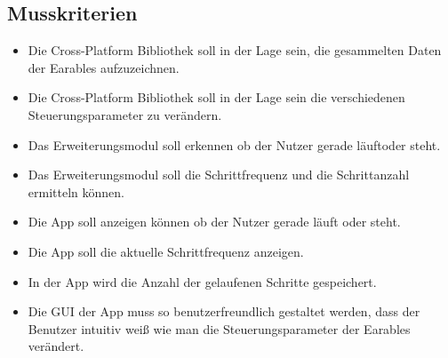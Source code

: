 \documentclass[a4paper,12pt]{article}
\begin{document}
\subsection{Musskriterien}

  \begin{itemize}
    \item Die \Gls{Cross-Platform Bibliothek} soll in der Lage sein, die gesammelten Daten der \Gls{Earables} aufzuzeichnen.
    \item Die \Gls{Cross-Platform Bibliothek} soll in der Lage sein die verschiedenen \Gls{Steuerungsparameter} zu verändern.
    \item Das Erweiterungsmodul soll erkennen ob der Nutzer gerade \glqq läuft\grqq{}oder \glqq steht\grqq.
    \item Das Erweiterungsmodul soll die \gls{Schrittfrequenz} und die Schrittanzahl ermitteln können.
    \item Die App soll anzeigen können ob der Nutzer gerade läuft oder steht.
    \item Die App soll die aktuelle Schrittfrequenz anzeigen.
    \item In der App wird die Anzahl der gelaufenen Schritte gespeichert.
    \item Die \Gls{GUI} der App muss so benutzerfreundlich gestaltet werden, dass der Benutzer intuitiv weiß wie man die \Gls{Steuerungsparameter} der \Gls{Earables} verändert.
  \end{itemize}
\end{document}
